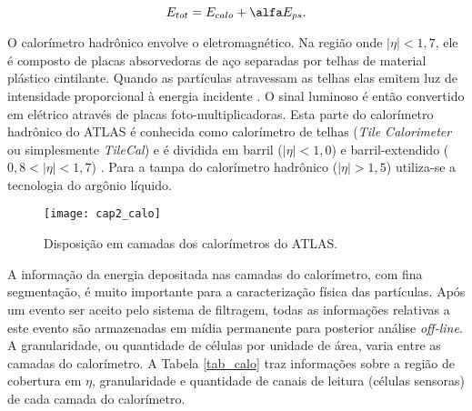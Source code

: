 \begin{equation}\label{ps}
E_{tot} = E_{calo} + \alfa E_{ps}.
\end{equation}

O calorímetro hadrônico envolve o eletromagnético. Na região
onde $|\eta|<1,7$, ele é composto de placas absorvedoras de aço separadas
por telhas de material plástico cintilante. Quando as partículas
atravessam as telhas elas emitem luz de intensidade proporcional à
energia incidente \cite{TDR1:ATLAS:1999}. O sinal luminoso é então
convertido em elétrico através de placas foto-multiplicadoras. Esta
parte do calorímetro hadrônico do ATLAS é conhecida como calorímetro
de telhas (\textit{Tile Calorimeter} ou simplesmente
\textit{TileCal}) e é dividida em barril ($|\eta|<1,0$) e
barril-extendido ($0,8<|\eta|<1,7$) \cite{article:tilecal:2006}. Para a tampa do calorímetro
hadrônico ($|\eta|>1,5$) utiliza-se a tecnologia do argônio líquido.

\begin{figure}[h]
\centering
\texttt{[image: cap2\_calo]}
\caption{Disposição em camadas dos calorímetros do ATLAS.}
\label{atlas_calo}
\end{figure}

A informação da energia depositada nas camadas do calorímetro, com
fina segmentação, é muito importante para a caracterização física
das partículas. Após um evento ser aceito pelo sistema de filtragem,
todas as informações relativas a este evento são armazenadas em
mídia permanente para posterior análise \textit{off-line}. A
granularidade, ou quantidade de células por unidade de área, varia
entre as camadas do calorímetro. A Tabela \ref{tab_calo} traz
informações sobre a região de cobertura em $\eta$, granularidade e
quantidade de canais de leitura (células sensoras) de cada camada do
calorímetro.

